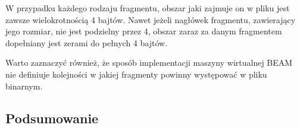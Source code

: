 W przypadku każdego rodzaju fragmentu, obszar jaki zajmuje on w pliku jest zawsze wielokrotnością 4 bajtów. Nawet jeżeli nagłówek fragmentu, zawierający jego rozmiar, nie jest podzielny przez 4, obszar zaraz za danym fragmentem dopełniany jest zerami do pełnych 4 bajtów.

Warto zaznaczyć również, że sposób implementacji maszyny wirtualnej BEAM nie definiuje kolejności w jakiej fragmenty powinny występować w pliku binarnym.
\subsection{Podsumowanie}
